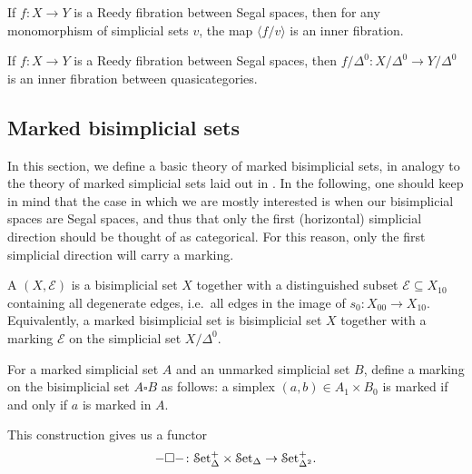 \documentclass[main.tex]{subfiles}
\begin{document}
\begin{theorem}
  \label{thm:inner_fibration_between_quasicategories}
  If $f\colon X \to Y$ is a Reedy fibration between Segal spaces, then for any monomorphism of simplicial sets $v$, the map $\langle f / v \rangle$ is an inner fibration.
\end{theorem}

\begin{corollary}
  If $f\colon X \to Y$ is a Reedy fibration between Segal spaces, then $f / \Delta^{0}\colon X / \Delta^{0} \to Y / \Delta^{0}$ is an inner fibration between quasicategories.
\end{corollary}

\subsection{Marked bisimplicial sets}
\label{ssc:marked_bisimplicial_sets}

In this section, we define a basic theory of marked bisimplicial sets, in analogy to the theory of marked simplicial sets laid out in \cite{highertopostheory}. In the following, one should keep in mind that the case in which we are mostly interested is when our bisimplicial spaces are Segal spaces, and thus that only the first (horizontal) simplicial direction should be thought of as categorical. For this reason, only the first simplicial direction will carry a marking.

\begin{definition}
  A  $(X, \mathcal{E})$ is a bisimplicial set $X$ together with a distinguished subset $\mathcal{E} \subseteq X_{10}$ containing all degenerate edges, i.e.\ all edges in the image of $s_{0}\colon X_{00} \to X_{10}$. Equivalently, a marked bisimplicial set is bisimplicial set $X$ together with a marking $\mathcal{E}$ on the simplicial set $X / \Delta^{0}$.
\end{definition}

\begin{definition}
  For a marked simplicial set $A$ and an unmarked simplicial set $B$, define a marking on the bisimplicial set $A \square B$ as follows: a simplex $(a, b) \in A_{1} \times B_{0}$ is marked if and only if $a$ is marked in $A$.
\end{definition}

This construction gives us a functor
\begin{equation*}
  - \square -  \colon \mathcal{S}\mathrm{et}_{\Delta}^{+} \times \mathcal{S}\mathrm{et}_{\Delta} \to \mathcal{S}\mathrm{et}_{\Delta^{2}}^{+}.
\end{equation*}
\end{document}
